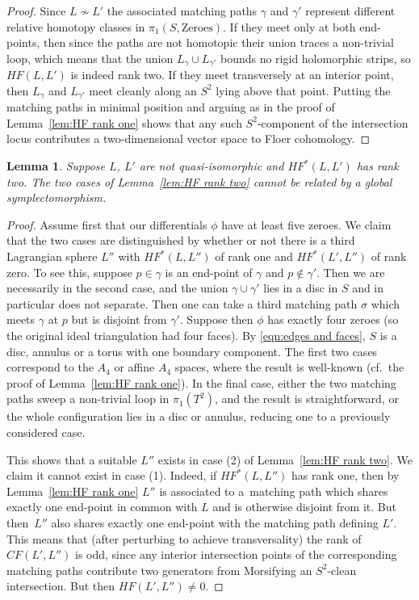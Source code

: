 \documentclass[10pt,a4paper]{amsart}
\newtheorem{lem}[thm]{Lemma}
\theoremstyle{definition}
\numberwithin{equation}{section}
\begin{document}
\begin{proof}
Since $L \not\sim L'$ the associated matching paths $\gamma$ and $\gamma'$ represent different relative homotopy classes in $\pi_1(S,\mathrm{Zeroes})$. If they meet only at both end-points, then since the paths are not homotopic their union traces a non-trivial loop, which means that the union $L_{\gamma} \cup L_{\gamma'}$ bounds no rigid holomorphic strips, so $HF(L,L')$ is indeed rank two. If they meet transversely at an interior point, then $L_{\gamma}$ and $L_{\gamma'}$ meet cleanly along an $S^2$ lying above that point. Putting the matching paths in minimal position and arguing as in the proof of Lemma~\ref{lem:HF rank one} shows that any such $S^2$-component of the intersection locus contributes a two-dimensional vector space to Floer cohomology.
\end{proof}


\begin{lem}\label{lem:two cases}
Suppose $L$, $L'$ are not quasi-isomorphic and $HF^*(L,L')$ has rank two. The two cases of Lemma~{\rm \ref{lem:HF rank two}} cannot be related by a global symplectomorphism.
\end{lem}

\begin{proof}
Assume first that our differentials $\phi$ have at least five zeroes. We claim that the two cases are distinguished by whether or not there is a third Lagrangian sphere $L''$ with $HF^*(L,L'')$ of rank one and $HF^*(L',L'')$ of rank zero. To see this, suppose
$p \in \gamma$ is an end-point of $\gamma$ and $p\not\in \gamma'$. Then we are necessarily in the second case, and the union $\gamma \cup \gamma'$ lies in a disc in $S$ and in particular does not separate. Then one can take a third matching path $\sigma$ which meets $\gamma$ at $p$ but is disjoint from $\gamma'$. Suppose then $\phi$ has exactly four zeroes (so the original ideal triangulation had four faces). By \eqref{eqn:edges and faces}, $S$ is a disc, annulus or a torus with one boundary component. The first two cases correspond to the $A_4$ or affine $A_4$ spaces, where the result is well-known (cf.~the proof of Lemma~\ref{lem:HF rank one}). In the final case, either the two matching paths sweep a non-trivial loop in $\pi_1(T^2)$, and the result is straightforward, or the whole configuration lies in a disc or annulus, reducing one to a previously considered case.

This shows that a suitable $L''$ exists in case (2) of Lemma~\ref{lem:HF rank two}. We claim it cannot exist in case (1). Indeed, if $HF^*(L,L'')$ has rank one, then by Lemma~\ref{lem:HF rank one} $L''$ is associated to a~matching path which shares exactly one end-point in common with $L$ and is otherwise disjoint from it. But then~$L''$ also shares exactly one end-point with the matching path defining $L'$. This means that (after perturbing to achieve transversality) the rank of ${CF}(L',L'')$ is odd, since any interior intersection points of the corresponding matching paths contribute two generators from Morsifying an $S^2$-clean intersection. But then $HF(L',L'') \neq 0$.
\end{proof}
\end{document}
